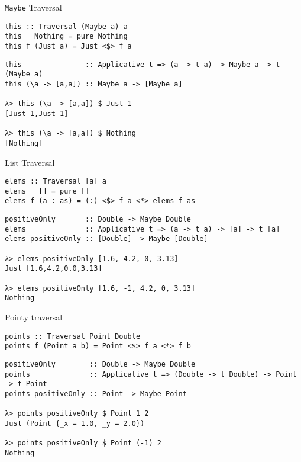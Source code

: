 \documentclass[presentation,aspectratio=169,8pt]{beamer}
\begin{document}
\begin{frame}[label={sec:org09f31f3},fragile]{\texttt{Maybe} Traversal}
 \begin{verbatim}
this :: Traversal (Maybe a) a
this _ Nothing = pure Nothing
this f (Just a) = Just <$> f a
\end{verbatim}

\pause

\begin{verbatim}
this               :: Applicative t => (a -> t a) -> Maybe a -> t (Maybe a)
this (\a -> [a,a]) :: Maybe a -> [Maybe a]

λ> this (\a -> [a,a]) $ Just 1
[Just 1,Just 1]

λ> this (\a -> [a,a]) $ Nothing
[Nothing]
\end{verbatim}
\end{frame}

\begin{frame}[label={sec:org5b786c6},fragile]{List Traversal}
 \begin{verbatim}
elems :: Traversal [a] a
elems _ [] = pure []
elems f (a : as) = (:) <$> f a <*> elems f as
\end{verbatim}

\pause

\begin{verbatim}
positiveOnly       :: Double -> Maybe Double
elems              :: Applicative t => (a -> t a) -> [a] -> t [a]
elems positiveOnly :: [Double] -> Maybe [Double]

λ> elems positiveOnly [1.6, 4.2, 0, 3.13]
Just [1.6,4.2,0.0,3.13]

λ> elems positiveOnly [1.6, -1, 4.2, 0, 3.13]
Nothing
\end{verbatim}
\end{frame}

\begin{frame}[label={sec:org11071cb},fragile]{Pointy traversal}
 \begin{verbatim}
points :: Traversal Point Double
points f (Point a b) = Point <$> f a <*> f b
\end{verbatim}

\pause

\begin{verbatim}
positiveOnly        :: Double -> Maybe Double
points              :: Applicative t => (Double -> t Double) -> Point -> t Point
points positiveOnly :: Point -> Maybe Point

λ> points positiveOnly $ Point 1 2
Just (Point {_x = 1.0, _y = 2.0})

λ> points positiveOnly $ Point (-1) 2
Nothing
\end{verbatim}
\end{frame}
\end{document}

